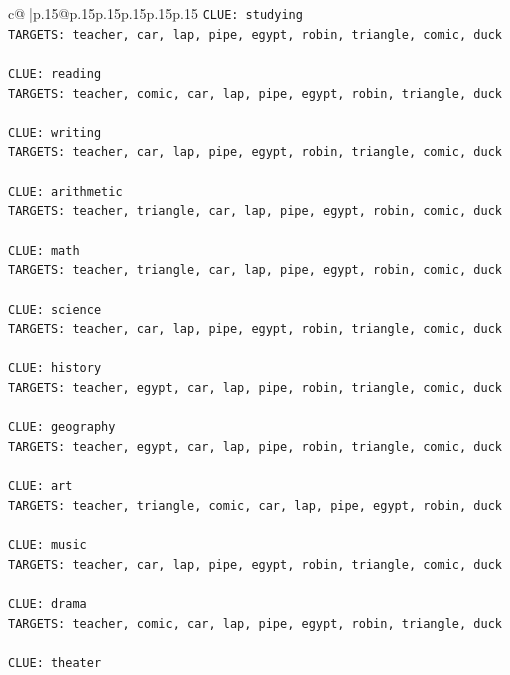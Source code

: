 \documentclass{article}
\begin{document}
{\begin{supertabular}{c@{$\;$}|p{.15\linewidth}@{}p{.15\linewidth}p{.15\linewidth}p{.15\linewidth}p{.15\linewidth}p{.15\linewidth}}
{{{\texttt{CLUE: studying} \\
\texttt{TARGETS: teacher, car, lap, pipe, egypt, robin, triangle, comic, duck} \\
\\ 
\texttt{CLUE: reading} \\
\texttt{TARGETS: teacher, comic, car, lap, pipe, egypt, robin, triangle, duck} \\
\\ 
\texttt{CLUE: writing} \\
\texttt{TARGETS: teacher, car, lap, pipe, egypt, robin, triangle, comic, duck} \\
\\ 
\texttt{CLUE: arithmetic} \\
\texttt{TARGETS: teacher, triangle, car, lap, pipe, egypt, robin, comic, duck} \\
\\ 
\texttt{CLUE: math} \\
\texttt{TARGETS: teacher, triangle, car, lap, pipe, egypt, robin, comic, duck} \\
\\ 
\texttt{CLUE: science} \\
\texttt{TARGETS: teacher, car, lap, pipe, egypt, robin, triangle, comic, duck} \\
\\ 
\texttt{CLUE: history} \\
\texttt{TARGETS: teacher, egypt, car, lap, pipe, robin, triangle, comic, duck} \\
\\ 
\texttt{CLUE: geography} \\
\texttt{TARGETS: teacher, egypt, car, lap, pipe, robin, triangle, comic, duck} \\
\\ 
\texttt{CLUE: art} \\
\texttt{TARGETS: teacher, triangle, comic, car, lap, pipe, egypt, robin, duck} \\
\\ 
\texttt{CLUE: music} \\
\texttt{TARGETS: teacher, car, lap, pipe, egypt, robin, triangle, comic, duck} \\
\\ 
\texttt{CLUE: drama} \\
\texttt{TARGETS: teacher, comic, car, lap, pipe, egypt, robin, triangle, duck} \\
\\ 
\texttt{CLUE: theater} \\
}}}
\end{supertabular}}
\end{document}
